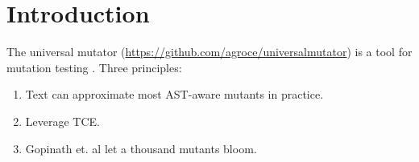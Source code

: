 \section{Introduction}

The universal mutator (\url{https://github.com/agroce/universalmutator}) is a tool for mutation testing \cite{PracProg,Mut2000}.  
Three principles:

\begin{enumerate}
\item Text can approximate most AST-aware mutants in practice.
\item Leverage TCE.
\item Gopinath et. al let a thousand mutants bloom.
\end{enumerate}

